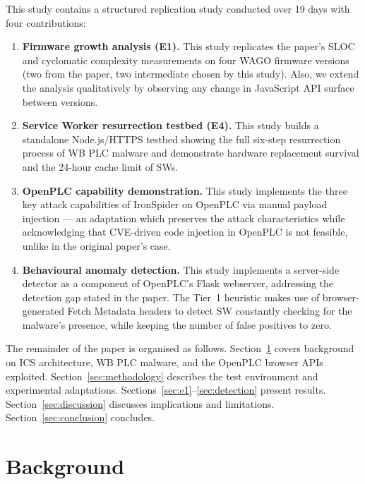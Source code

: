 \documentclass[conference]{IEEEtran}
\begin{document}
This study contains a structured replication study conducted over
19 days with four contributions:
\begin{enumerate}
  \item \textbf{Firmware growth analysis (E1).} This study replicates the paper's SLOC and cyclomatic complexity measurements on four WAGO firmware versions (two from the paper, two intermediate chosen by this study). Also, we extend the analysis qualitatively by observing any change in JavaScript API surface between versions. 
  \item \textbf{Service Worker resurrection testbed (E4).} 
      This study builds a standalone Node.js/HTTPS testbed showing the full six-step resurrection process of WB PLC malware and demonstrate hardware replacement survival and the 24-hour cache limit of SWs.

  \item \textbf{OpenPLC capability demonstration.} 
      This study implements the three key attack capabilities of IronSpider on OpenPLC via manual payload injection --- an adaptation which preserves the attack characteristics while acknowledging that CVE-driven code injection in OpenPLC is not feasible, unlike in the original paper's case.

  \item \textbf{Behavioural anomaly detection.} This study implements a server-side detector as a component of OpenPLC's Flask webserver, addressing the detection gap stated in the paper. The Tier~1 heuristic makes use of browser-generated Fetch Metadata headers to detect SW constantly checking for the malware's presence, while keeping the number of false positives to zero.
\end{enumerate}

The remainder of the paper is organised as follows.
Section~\ref{sec:background} covers background on ICS architecture,
WB PLC malware, and the OpenPLC browser APIs exploited.
Section~\ref{sec:methodology} describes the test environment and experimental
adaptations.
Sections~\ref{sec:e1}--\ref{sec:detection} present results.
Section~\ref{sec:discussion} discusses implications and limitations.
Section~\ref{sec:conclusion} concludes.

\section{Background}
\label{sec:background}
\end{document}
